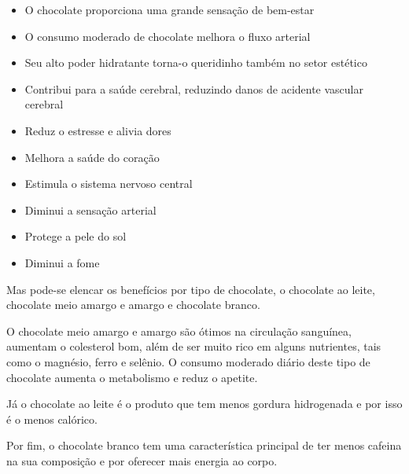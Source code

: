 \documentclass[
	12pt,				%
	openright,			%
	oneside,			%
	a4paper,			%
	english,			%
	french,				%
	spanish,			%
	brazil				%
	]{abntex2}
\begin{document}
\begin{itemize}
\item O chocolate proporciona uma grande sensação de bem-estar
\item O consumo moderado de chocolate melhora o fluxo arterial 
\item Seu alto poder hidratante torna-o queridinho também no setor estético
\item Contribui para a saúde cerebral, reduzindo danos de acidente vascular cerebral
\item Reduz o estresse e alivia dores 
\item Melhora a saúde do coração
\item Estimula o sistema nervoso central
\item Diminui a sensação arterial
\item Protege a pele do sol
\item Diminui a fome
\end{itemize}

Mas pode-se elencar os benefícios por tipo de chocolate, o chocolate ao leite, chocolate meio amargo e amargo e chocolate branco.

O chocolate meio amargo e amargo são ótimos na circulação sanguínea, aumentam o colesterol bom, além de ser muito rico em alguns nutrientes, tais como o magnésio, ferro e selênio. O consumo moderado diário deste tipo de chocolate aumenta o metabolismo e reduz o apetite. \cite{saude}
	
Já o chocolate ao leite é o produto que tem menos gordura hidrogenada e por isso é o menos calórico.
	
Por fim, o chocolate branco tem uma característica principal de ter menos cafeina na sua composição e por oferecer mais energia ao corpo. \cite{saude}
\end{document}
